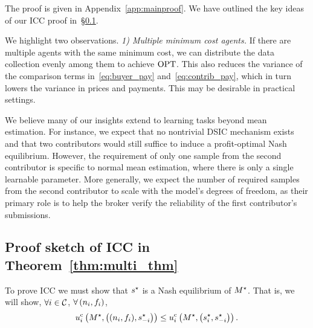 The proof  is given in Appendix~\ref{app:mainproof}.
We have outlined the key ideas of our ICC proof in~\S\ref{sec:iccsketch}.

We highlight two observations.
\emph{1) Multiple minimum cost agents.}  
If there are multiple agents with the same minimum cost, we can distribute the data collection evenly among them to achieve ${\rm OPT}$.
This also reduces the variance of the comparison terms in~\eqref{eq:buyer_pay} and~\eqref{eq:contrib_pay}, which in turn lowers the variance in prices and payments.
This may be desirable in practical settings.  

We believe many of our insights extend to learning tasks beyond mean estimation. For instance, we expect that no nontrivial DSIC mechanism exists and that two contributors would still suffice to induce a profit-optimal Nash equilibrium. However, the requirement of only one sample from the second contributor is specific to normal mean estimation, where there is only a single learnable parameter. More generally, we expect the number of required samples from the second contributor to scale with the model's degrees of freedom, as their primary role is to help the broker verify the reliability of the first contributor's submissions.  

\subsection{Proof sketch of ICC in Theorem~\ref{thm:multi_thm}}
\label{sec:iccsketch}


To prove ICC we must show that $s^\star$ is a Nash equilibrium of $M^\star$. 
That is, we will show, $\forall i\in\mathcal{C}$, 
    $\forall\left(n_i,f_i\right)$,
    \begin{equation*}
        u^{\rm c}_{i}\left(
            M^\star, \left(
                (n_i,f_i),
                s_{-i}^{\star}
            \right)
        \right)
        \leq
        u^{\rm c}_{i}\left(
            M^\star, \left(
                s_i^\star,
                s_{-i}^{\star}
            \right)
        \right) . 
    \end{equation*}

